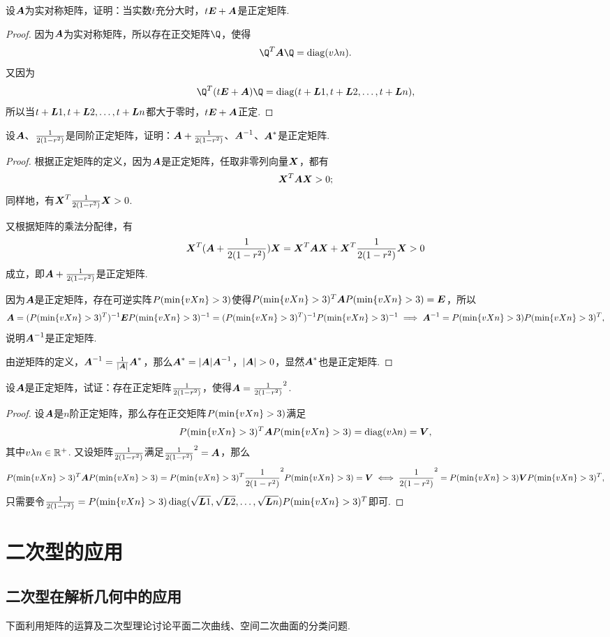 \begin{example}
设\(\A\)为实对称矩阵，证明：当实数\(t\)充分大时，\(t\E+\A\)是正定矩阵.
\begin{proof}
因为\(\A\)为实对称矩阵，所以存在正交矩阵\(\Q\)，使得\[
\Q^T\A\Q = \diag(\v{\lambda}{n}).
\]又因为\[
\Q^T(t\E+\A)\Q
= \diag(t+\L{1},t+\L{2},\dotsc,t+\L{n}),
\]所以当\(t+\L{1},t+\L{2},\dotsc,t+\L{n}\)都大于零时，\(t\E+\A\)正定.
\end{proof}
\end{example}

\begin{example}
设\(\A\)、\(\B\)是同阶正定矩阵，证明：\(\A+\B\)、\(\A^{-1}\)、\(\A^*\)是正定矩阵.
\begin{proof}
根据正定矩阵的定义，因为\(\A\)是正定矩阵，任取非零列向量\(\x\)，都有\[
\x^T\A\x > 0;
\]同样地，有\(\x^T\B\x > 0\).

又根据矩阵的乘法分配律，有\[
\x^T(\A+\B)\x = \x^T\A\x + \x^T\B\x > 0
\]成立，即\(\A+\B\)是正定矩阵.

因为\(\A\)是正定矩阵，存在可逆实阵\(\P\)使得\(\P^T\A\P=\E\)，所以\[
\A = (\P^T)^{-1}\E\P^{-1} = (\P^T)^{-1}\P^{-1}
\implies
\A^{-1} = \P\P^T,
\]说明\(\A^{-1}\)是正定矩阵.

由逆矩阵的定义，\(\A^{-1}=\frac{1}{\abs{\A}}\A^*\)，那么\(\A^*=\abs{\A}\A^{-1}\)，\(\abs{\A}>0\)，显然\(\A^*\)也是正定矩阵.
\end{proof}
\end{example}

\begin{example}
设\(\A\)是正定矩阵，试证：存在正定矩阵\(\B\)，使得\(\A=\B^2\).
\begin{proof}
设\(\A\)是\(n\)阶正定矩阵，那么存在正交矩阵\(\P\)满足\[
\P^T\A\P = \diag(\v{\lambda}{n}) = \V,
\]其中\(\v{\lambda}{n} \in \mathbb{R}^+\).
又设矩阵\(\B\)满足\(\B^2=\A\)，那么\[
\P^T\A\P = \P^T\B^2\P = \V
\iff
\B^2 = \P\V\P^T,
\]
只需要令\(\B = \P \diag(\sqrt{\L{1}},\sqrt{\L{2}},\dotsc,\sqrt{\L{n}}) \P^T\)即可.
\end{proof}
\end{example}

\section{二次型的应用}
\subsection{二次型在解析几何中的应用}
下面利用矩阵的运算及二次型理论讨论平面二次曲线、空间二次曲面的分类问题.
